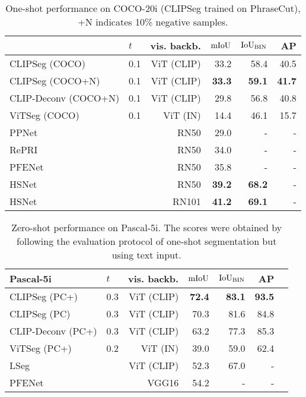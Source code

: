 \begin{table}[t]
    \centering
    \footnotesize
    \setlength{\tabcolsep}{1.7mm}
    \begin{tabular}{llrrrr}
        \midrule
        & $t$ & vis. backb. & $\text{mIoU}$ & $\text{IoU}_{\text{BIN}}$ &  AP  \\
        \midrule
CLIPSeg (COCO) & 0.1 & ViT (CLIP) &  33.2 & 58.4 & 40.5 \\
CLIPSeg (COCO+N)  & 0.1 & ViT (CLIP) &  \textbf{33.3} & \textbf{59.1} & \textbf{41.7} \\
CLIP-Deconv (COCO+N)  & 0.1 & ViT (CLIP) &  29.8 & 56.8 & 40.8 \\
ViTSeg (COCO)  & 0.1 & ViT (IN) &  14.4 & 46.1 & 15.7 \\
        \midrule
        PPNet \cite{liu20} & & RN50 & 29.0  & - & -  \\
        RePRI \cite{boudiaf20} & & RN50  & 34.0  & - & - \\
        PFENet \cite{tian20a} & & RN50 & 35.8 & - & - \\
        HSNet \cite{min21hsnet} & & RN50 & \textbf{39.2} & \textbf{68.2} & - \\
        \midrule
        HSNet \cite{min21hsnet} & & RN101 & \textbf{41.2} & \textbf{69.1} & - \\
        \bottomrule
    \end{tabular} %
    \caption{One-shot performance on COCO-20i (CLIPSeg trained on PhraseCut), +N indicates 10\% negative samples.}
    \label{tab:coco20i_oneshot}
\end{table}

\begin{table}[t]
    \centering
    \footnotesize
    \setlength{\tabcolsep}{1mm}
    \begin{tabular}{llrrrrr}
         \toprule 
        \textbf{Pascal-5i} & $t$ & vis. backb. & $\text{mIoU}$ & $\text{IoU}_{\text{BIN}}$ &  AP \\
        \midrule
CLIPSeg (PC+) & 0.3 & ViT (CLIP) & \textbf{72.4} & \textbf{83.1} & \textbf{93.5} \\
CLIPSeg (PC) & 0.3 & ViT (CLIP) & 70.3 & 81.6 & 84.8 \\
CLIP-Deconv (PC+) & 0.3 & ViT (CLIP) & 63.2 & 77.3 & 85.3 \\
ViTSeg (PC+) & 0.2 & ViT (IN) & 39.0 & 59.0 & 62.4 \\
        \midrule
        LSeg  \cite{li2022languagedriven} & & ViT (CLIP) & 52.3 & 67.0 & -  \\
        PFENet \cite{tian20a} & & VGG16 & 54.2 & - & - \\
        \bottomrule
    \end{tabular}%
    \caption{Zero-shot performance on Pascal-5i. The scores were obtained by following the evaluation protocol of one-shot segmentation but using text input.}
    \label{tab:pas5i_zeroshot}
\end{table}

